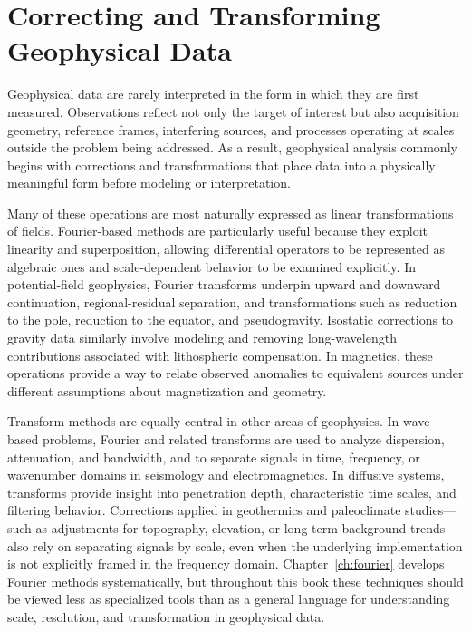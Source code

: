 \section{Correcting and Transforming Geophysical Data}

Geophysical data are rarely interpreted in the form in which they are first measured. Observations reflect not only the target of interest but also acquisition geometry, reference frames, interfering sources, and processes operating at scales outside the problem being addressed. As a result, geophysical analysis commonly begins with corrections and transformations that place data into a physically meaningful form before modeling or interpretation.

Many of these operations are most naturally expressed as linear transformations of fields. Fourier-based methods are particularly useful because they exploit linearity and superposition, allowing differential operators to be represented as algebraic ones and scale-dependent behavior to be examined explicitly. In potential-field geophysics, Fourier transforms underpin upward and downward continuation, regional-residual separation, and transformations such as reduction to the pole, reduction to the equator, and pseudogravity. Isostatic corrections to gravity data similarly involve modeling and removing long-wavelength contributions associated with lithospheric compensation. In magnetics, these operations provide a way to relate observed anomalies to equivalent sources under different assumptions about magnetization and geometry.

Transform methods are equally central in other areas of geophysics. In wave-based problems, Fourier and related transforms are used to analyze dispersion, attenuation, and bandwidth, and to separate signals in time, frequency, or wavenumber domains in seismology and electromagnetics. In diffusive systems, transforms provide insight into penetration depth, characteristic time scales, and filtering behavior. Corrections applied in geothermics and paleoclimate studies—such as adjustments for topography, elevation, or long-term background trends—also rely on separating signals by scale, even when the underlying implementation is not explicitly framed in the frequency domain. Chapter~\ref{ch:fourier} develops Fourier methods systematically, but throughout this book these techniques should be viewed less as specialized tools than as a general language for understanding scale, resolution, and transformation in geophysical data.

